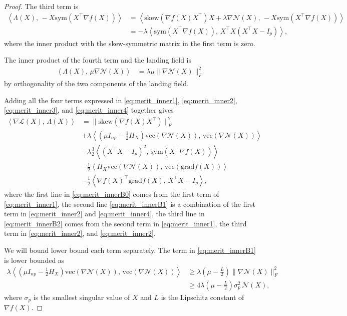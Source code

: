 \documentclass[twoside,11pt]{article}
\newcommand{\grad}{{\mathrm{grad}}}
\newcommand{\sk}{{\mathrm{skew}}}
\newcommand{\sym}{{\mathrm{sym}}}
\newcommand{\vect}[1]{\mathrm{vec}\left(#1\right)}
\newcommand{\cN}{\mathcal{N}} %
\newcommand{\cL}{\mathcal{L}} %
\newcommand{\vectHess}[1]{H_{#1}} %
\newcommand{\nfX}{\nabla f(X)} %
\newcommand{\inner}[2]{\left\langle#1,\,#2\right\rangle} %
\newcommand{\Lc}{L} %
\begin{document}
\begin{proof}
    The third term is
    \begin{align}
        \inner{\Lambda(X)}{-X\sym(X^\top \nabla f(X))} &= \inner{\sk(\nabla f(X) X^\top)X + \lambda \nabla \cN(X)}{-X\sym(X^\top \nabla f(X))}\\
        &= -\lambda\inner{\sym(X^\top \nabla f(X))}{X^\top X (X^\top X - I_p)}, \label{eq:merit_inner3}
    \end{align} 
    where the inner product with the skew-symmetric matrix in the first term is zero.
    
    The inner product of the fourth term and the landing field is
    \begin{align}
        \inner{\Lambda(X)}{\mu \nabla \cN(X)} &= \lambda \mu \| \nabla \cN(X) \|^2_F \label{eq:merit_inner4}
    \end{align}
    by orthogonality of the two components of the landing field.

    Adding all the four terms expressed in \eqref{eq:merit_inner1}, \eqref{eq:merit_inner2},  \eqref{eq:merit_inner3}, and  \eqref{eq:merit_inner4} together gives
    \begin{align}
         \inner{\nabla \cL(X)}{\Lambda(X)} &= \| \sk(\nabla f(X) X^\top) \|_F^2 \label{eq:merit_innerB0}\\
            & + \lambda \inner{\left(\mu I_{np} - \frac12 \vectHess{X}\right) \vect{\nabla\cN(X)}}{\vect{\nabla\cN(X)}} \label{eq:merit_innerB1}\\
            & - \lambda \frac32 \inner{(X^{\top}X-I_p)^2}{\sym(X^\top \nabla f(X))} \label{eq:merit_innerB2}\\
            & -\frac12\inner{\vectHess{X} \vect{ \nabla \cN(X)}}{\vect{\grad f(X)}} \label{eq:merit_innerB3}\\
            & -\frac12\inner{\nfX^{\top} \grad f(X)}{X^{\top}X - I_p}, \label{eq:merit_innerB4}
    \end{align}
    where the first line in \eqref{eq:merit_innerB0} comes from the first term of \eqref{eq:merit_inner1}, the second line \eqref{eq:merit_innerB1} is a combination of the first term in \eqref{eq:merit_inner2} and \eqref{eq:merit_inner4}, the third line in \eqref{eq:merit_innerB2} comes from the second term in \eqref{eq:merit_inner1}, the third term in \eqref{eq:merit_inner2},  and \eqref{eq:merit_inner2}.

    
    We will bound lower bound each term separately. The term in \eqref{eq:merit_innerB1} is lower bounded as
    \begin{align}
        \lambda \inner{\left(\mu I_{np} - \frac12 \vectHess{X}\right) \vect{\nabla\cN(X)}}{\vect{\nabla\cN(X)}} &\geq \lambda \left(\mu-\frac{\Lc}{2}\right)\| \nabla\cN(X) \|^2_F \\
            &\geq 4 \lambda \left(\mu-\frac{\Lc}{2}\right) \sigma_p^2 \, \cN(X), \label{eq:merit_boundB1} 
    \end{align}
    where $\sigma_p$ is the smallest singular value of $X$ and $\Lc$ is the Lipschitz constant of $\nabla f(X)$.


\end{proof}
\end{document}
